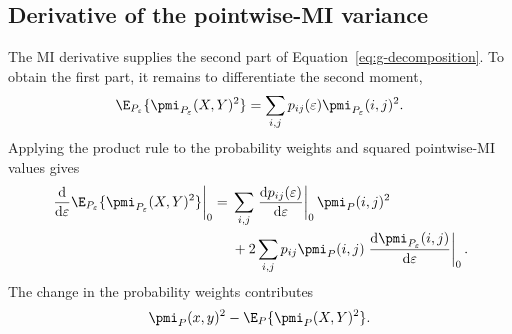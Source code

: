 \subsection{Derivative of the pointwise-MI variance}

The MI derivative supplies the second part of
Equation~\eqref{eq:g-decomposition}. To obtain the first part, it remains
to differentiate the second moment,
\begin{equation}
  \E_{P_\varepsilon}\{\pmi_{P_\varepsilon}(X,Y)^2\}
  =\sum_{i,j}p_{ij}(\varepsilon)
  \pmi_{P_\varepsilon}(i,j)^2.
\end{equation}
Applying the product rule to the probability weights and squared
pointwise-MI values gives
\begin{align}
  \left.\frac{\mathrm d}{\mathrm d\varepsilon}
  \E_{P_\varepsilon}\{\pmi_{P_\varepsilon}(X,Y)^2\}
  \right|_{0}
  ={}&
  \sum_{i,j}
  \left.\frac{\mathrm d p_{ij}(\varepsilon)}{\mathrm d\varepsilon}
  \right|_{0}
  \pmi_P(i,j)^2
  \notag\\
  &+
  2\sum_{i,j}p_{ij}\pmi_P(i,j)
  \left.\frac{\mathrm d\pmi_{P_\varepsilon}(i,j)}
  {\mathrm d\varepsilon}\right|_{0}.
  \label{eq:m2-product-rule}
\end{align}
The change in the probability weights contributes
\begin{equation}
  \pmi_P(x,y)^2-\E_P\{\pmi_P(X,Y)^2\}.
  \label{eq:m2-weight-term}
\end{equation}

